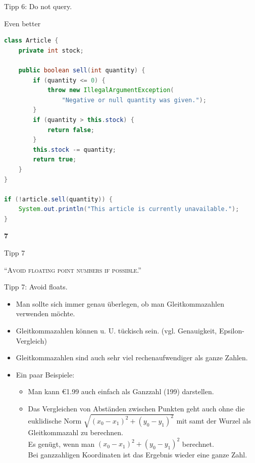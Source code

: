 \documentclass[18pt]{beamer}
\newcommand{\quotes}[1]{``#1''}
\begin{document}
\begin{frame}[fragile]{Tipp 6: Do not query.}
    \begin{block}{Even better}
        \begin{lstlisting}[language=Java,basicstyle=\scriptsize]
class Article {
    private int stock;

    public boolean sell(int quantity) {
        if (quantity <= 0) {
            throw new IllegalArgumentException(
                "Negative or null quantity was given.");
        }
        if (quantity > this.stock) {
            return false;
        }
        this.stock -= quantity;
        return true;
    }
}

if (!article.sell(quantity)) {
    System.out.println("This article is currently unavailable.");
}
        \end{lstlisting}
    \end{block}
\end{frame}

\begin{frame}{\quad}
    \center
    \Huge{\textbf{7}}
\end{frame}

\begin{frame}{Tipp 7}
    \begin{block}{}
        \center
        \textsc{\quotes{Avoid floating point numbers if possible.}}
    \end{block}
\end{frame}

\begin{frame}{Tipp 7: Avoid floats.}
    \begin{itemize}
        \item Man sollte sich immer genau überlegen, ob man Gleitkommazahlen verwenden möchte.
        \item Gleitkommazahlen können u. U. tü­ckisch sein. (vgl. Genauigkeit, Epsilon-Vergleich)
        \item Gleitkommazahlen sind auch sehr viel rechenaufwendiger als ganze Zahlen.
        \item Ein paar Beispiele:
        \begin{itemize}
            \item Man kann \euro 1.99 auch einfach als Ganzzahl (199) darstellen.
            \item Das Vergleichen von Abständen zwischen Punkten geht auch ohne die euklidische Norm
            $\sqrt{(x_0 - x_1)^2 + (y_0 - y_1)^2}$ mit samt der Wurzel als Gleitkommazahl zu berechnen.\\
            Es genügt, wenn man $(x_0 - x_1)^2 + (y_0 - y_1)^2$ berechnet.\\
            Bei ganzzahligen Koordinaten ist das Ergebnis wieder eine ganze Zahl.
        \end{itemize}
    \end{itemize}
\end{frame}
\end{document}
